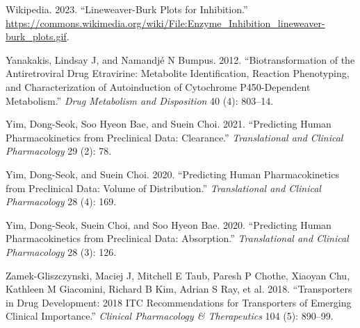 \documentclass[
  11pt,
  krantz2, a4paper, twoside]{krantz}
\newlength{\cslhangindent}
\newlength{\cslentryspacingunit} %
\newenvironment{CSLReferences}[2] %
 {%
  \setlength{\parindent}{0pt}
  \ifodd #1
  \let\oldpar\par
  \def\par{\hangindent=\cslhangindent\oldpar}
  \fi
  \setlength{\parskip}{#2\cslentryspacingunit}
 }%
 {}
\begin{document}
\begin{CSLReferences}{1}{0}
\leavevmode{}%
Wikipedia. 2023. {``Lineweaver-Burk Plots for Inhibition.''} \url{https://commons.wikimedia.org/wiki/File:Enzyme_Inhibition_lineweaver-burk_plots.gif}.

\leavevmode{}%
Yanakakis, Lindsay J, and Namandjé N Bumpus. 2012. {``Biotransformation of the Antiretroviral Drug Etravirine: Metabolite Identification, Reaction Phenotyping, and Characterization of Autoinduction of Cytochrome P450-Dependent Metabolism.''} \emph{Drug Metabolism and Disposition} 40 (4): 803--14.

\leavevmode{}%
Yim, Dong-Seok, Soo Hyeon Bae, and Suein Choi. 2021. {``Predicting Human Pharmacokinetics from Preclinical Data: Clearance.''} \emph{Translational and Clinical Pharmacology} 29 (2): 78.

\leavevmode{}%
Yim, Dong-Seok, and Suein Choi. 2020. {``Predicting Human Pharmacokinetics from Preclinical Data: Volume of Distribution.''} \emph{Translational and Clinical Pharmacology} 28 (4): 169.

\leavevmode{}%
Yim, Dong-Seok, Suein Choi, and Soo Hyeon Bae. 2020. {``Predicting Human Pharmacokinetics from Preclinical Data: Absorption.''} \emph{Translational and Clinical Pharmacology} 28 (3): 126.

\leavevmode{}%
Zamek-Gliszczynski, Maciej J, Mitchell E Taub, Paresh P Chothe, Xiaoyan Chu, Kathleen M Giacomini, Richard B Kim, Adrian S Ray, et al. 2018. {``Transporters in Drug Development: 2018 ITC Recommendations for Transporters of Emerging Clinical Importance.''} \emph{Clinical Pharmacology \& Therapeutics} 104 (5): 890--99.

\end{CSLReferences}

\printindex
\end{document}
